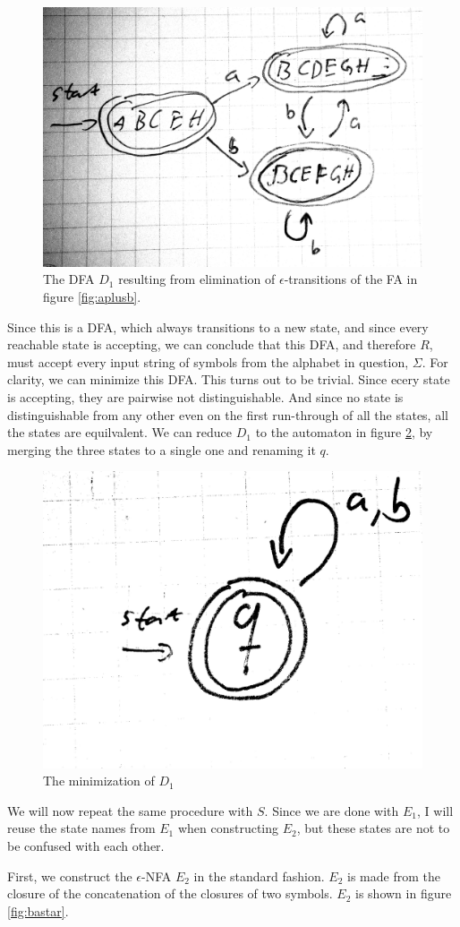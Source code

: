 \documentclass{article}
\begin{document}
\begin{figure}[htpb]
    \centering
    \includegraphics[width=0.6\linewidth]{aplusbmin}
    \caption{The DFA $D_1$ resulting from elimination of $\epsilon$-transitions of the FA in figure \ref{fig:aplusb}.}
    \label{fig:aplusbmin}
\end{figure}


Since this is a DFA, which always transitions to a new state, and since every reachable state is accepting, we can conclude that this DFA, and therefore $R$, must accept every input string of symbols from the alphabet in question, $\Sigma$. For clarity, we can minimize this DFA. This turns out to be trivial. Since ecery state is accepting, they are pairwise not distinguishable. And since no state is distinguishable from any other even on the first run-through of all the states, all the states are equilvalent. We can reduce $D_1$ to the automaton in figure \ref{fig:minimizedfinal}, by merging the three states to a single one and renaming it $q$.

\begin{figure}[htpb]
    \centering
    \includegraphics[width=0.3\linewidth]{minimizedfinal}
    \caption{The minimization of $D_1$}
    \label{fig:minimizedfinal}
\end{figure}

We will now repeat the same procedure with $S$. Since we are done with $E_1$, I will reuse the state names from $E_1$ when constructing $E_2$, but these states are not to be confused with each other.

First, we construct the $\epsilon$-NFA $E_2$ in the standard fashion. $E_2$ is made from the closure of the concatenation of the closures of two symbols. $E_2$ is shown in figure \ref{fig:bastar}.
\end{document}
